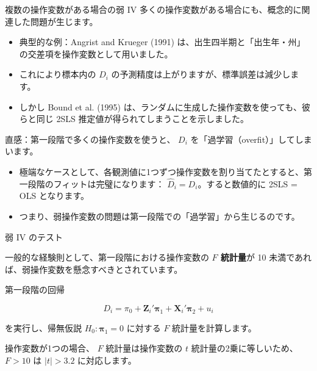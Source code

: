 \documentclass[11pt,handout]{beamer}
\newenvironment{wideitemize}{\itemize\addtolength{\itemsep}{10pt}}{\enditemize}
\begin{document}
\begin{frame}{複数の操作変数がある場合の弱 IV}
	\vspace{0.2cm}
	多くの操作変数がある場合にも、概念的に関連した問題が生じます。 \pause{}
	
	\begin{itemize}
		\item 典型的な例：Angrist and Krueger (1991) は、出生四半期と「出生年・州」の交差項を操作変数として用いました。 \pause{}
		\vspace{0.1cm}
		\item これにより標本内の $D_i$ の予測精度は上がりますが、標準誤差は減少します。 \pause{}
		\vspace{0.1cm}
		\item しかし Bound et al. (1995) は、ランダムに生成した操作変数を使っても、彼らと同じ 2SLS 推定値が得られてしまうことを示しました。
	\end{itemize}
	\pause{}
	\vspace{0.4cm}
	
	直感：第一段階で多くの操作変数を使うと、 $D_i$ を「過学習（overfit）」してしまいます。 \pause{}
	
	
	\begin{itemize}
		\item 極端なケースとして、各観測値に1つずつ操作変数を割り当てたとすると、第一段階のフィットは完璧になります： $\hat{D}_i = D_i$。すると数値的に 2SLS = OLS となります。
		\item つまり、弱操作変数の問題は第一段階での「過学習」から生じるのです。
	\end{itemize}
	
\end{frame}


\begin{frame}{弱 IV のテスト}
	\begin{wideitemize}
		\item
		一般的な経験則として、第一段階における操作変数の \textbf{$F$ 統計量}が 10 未満であれば、弱操作変数を懸念すべきとされています。
		
		\item
		第一段階の回帰
		
		$$D_i = \pi_0 + \bm{Z}_i ' \bm{\pi}_1 + \bm{X}_i' \bm{\pi}_2 + u_i$$
		
		\noindent を実行し、帰無仮説 $H_0: \bm{\pi}_1 = 0$ に対する $F$ 統計量を計算します。
		
		\item
		操作変数が1つの場合、 $F$ 統計量は操作変数の $t$ 統計量の2乗に等しいため、 $F>10$ は $|t| > 3.2$ に対応します。
		
		
	\end{wideitemize}
\end{frame}
\end{document}
